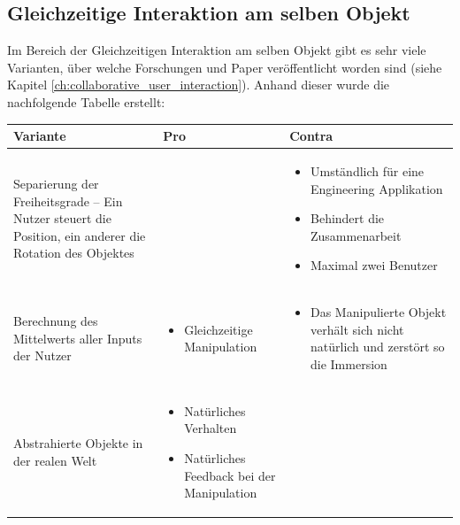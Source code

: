\subsection{Gleichzeitige Interaktion am selben Objekt}
Im Bereich der Gleichzeitigen Interaktion am selben Objekt gibt es sehr viele Varianten, über welche Forschungen und Paper veröffentlicht worden sind (siehe Kapitel \ref{ch:collaborative_user_interaction}). Anhand dieser wurde die nachfolgende Tabelle erstellt:

\begin{center}
	\begin{tabularx} {\textwidth} { | B | B | B | }
		\hline
		\color{white} \textbf{Variante} & \color{white} \textbf{Pro} & 
		\color{white} \textbf{Contra} \\
		\hline
		\vspace{1pt}
		Separierung der Freiheitsgrade – Ein Nutzer steuert die Position, ein anderer die Rotation des Objektes &  &
		\begin{itemize} [leftmargin=*,noitemsep,topsep=0pt]
			\item Umständlich für eine Engineering Applikation
			\item Behindert die Zusammenarbeit
			\item Maximal zwei Benutzer
		\end{itemize} \\
		\hline
		\vspace{1pt}
		Berechnung des Mittelwerts aller Inputs der Nutzer & 
		\begin{itemize} [leftmargin=*,noitemsep,topsep=0pt]
			\item Gleichzeitige Manipulation
		\end{itemize} & 
		\begin{itemize} [leftmargin=*,noitemsep,topsep=0pt]
			\item Das Manipulierte Objekt verhält sich nicht natürlich und zerstört so die Immersion
		\end{itemize} \\
		\hline
		\vspace{1pt}
		Abstrahierte Objekte in der realen Welt & 
		\begin{itemize} [leftmargin=*,noitemsep,topsep=0pt]
			\item Natürliches Verhalten
			\item Natürliches Feedback bei der Manipulation
		\end{itemize} & 
		\begin{itemize} [leftmargin=*,noitemsep,topsep=0pt]

\end{itemize}
\end{tabularx}
\end{center}
